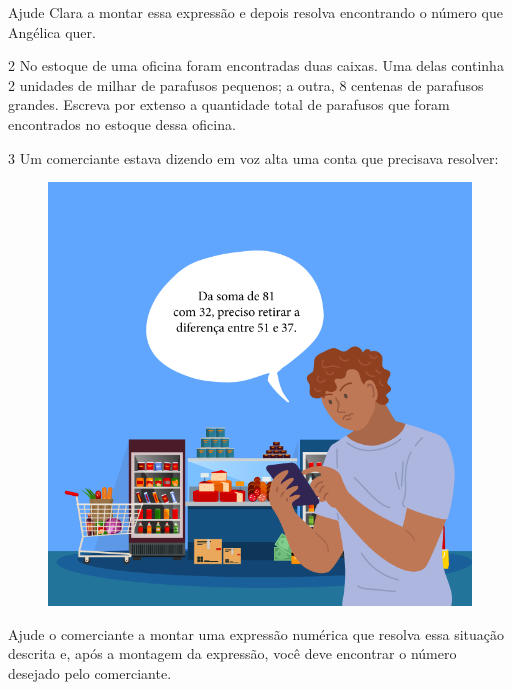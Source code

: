 Ajude Clara a montar essa expressão e depois resolva encontrando o
número que Angélica quer.

\bigskip
\bigskip
\bigskip
\bigskip
\bigskip
\bigskip

\num{2} No estoque de uma oficina foram encontradas duas caixas.
Uma delas continha 2 unidades de milhar de parafusos pequenos; a outra, 8
centenas de parafusos grandes. Escreva por extenso a quantidade total de
parafusos que foram encontrados no estoque dessa oficina.

\bigskip
\bigskip
\bigskip
\bigskip

\pagebreak
\num{3} Um comerciante estava dizendo em voz alta uma conta que precisava
resolver:

\begin{figure}[htpb!]
\centering
\includegraphics[width=\textwidth]{../ilustracoes/MAT5/SAEB_5ANO_MAT_figura91.png}
\end{figure}

Ajude o comerciante a montar uma expressão numérica que resolva
essa situação descrita e, após a montagem da expressão, você deve
encontrar o número desejado pelo comerciante.


